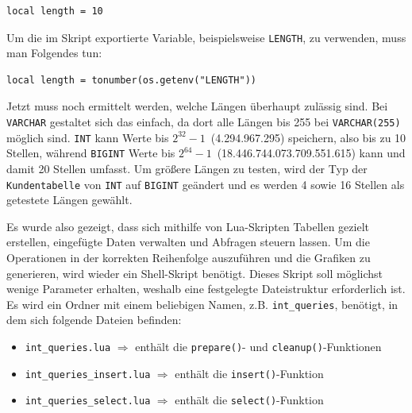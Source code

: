 \vspace{-5pt}
\begin{lstlisting}[language={[5.0]Lua},label={lst:tools-without-imported-length,style=custom_daniel}]
local length = 10
\end{lstlisting}
\vspace{-7pt}

Um die im Skript exportierte Variable, beispielsweise \texttt{LENGTH}, zu verwenden, muss man Folgendes tun:
\vspace{-5pt}
\begin{lstlisting}[language={[5.0]Lua},label={lst:tools-with-imported-length,style=custom_daniel}]
local length = tonumber(os.getenv("LENGTH"))
\end{lstlisting}
\vspace{-5pt}

Jetzt muss noch ermittelt werden, welche Längen überhaupt zulässig sind.
Bei \texttt{VARCHAR} gestaltet sich das einfach, da dort alle Längen bis 255 bei \texttt{VARCHAR(255)} möglich sind.
\texttt{INT} kann Werte bis \(2^{32} - 1\)~(4.294.967.295) speichern, also bis zu 10 Stellen, während \texttt{BIGINT} Werte bis \(2^{64} - 1\)~(18.446.744.073.709.551.615) kann und damit 20 Stellen umfasst.
Um größere Längen zu testen, wird der Typ der \texttt{Kundentabelle} von \texttt{INT} auf \texttt{BIGINT} geändert und es werden 4 sowie 16 Stellen als getestete Längen gewählt.

Es wurde also gezeigt, dass sich mithilfe von Lua-Skripten Tabellen gezielt erstellen, eingefügte Daten verwalten und Abfragen steuern lassen.
Um die Operationen in der korrekten Reihenfolge auszuführen und die Grafiken zu generieren, wird wieder ein Shell-Skript benötigt.
Dieses Skript soll möglichst wenige Parameter erhalten, weshalb eine festgelegte Dateistruktur erforderlich ist.
Es wird ein Ordner mit einem beliebigen Namen, z.B. \texttt{int\_queries}, benötigt, in dem sich folgende Dateien befinden:

\begin{itemize}\label{files_structure}
    \setlength{\itemsep}{-5pt}
    \item \texttt{int\_queries.lua} $\Rightarrow$ enthält die \texttt{prepare()}- und \texttt{cleanup()}-Funktionen
    \item \texttt{int\_queries\_insert.lua} $\Rightarrow$ enthält die \texttt{insert()}-Funktion
    \item \texttt{int\_queries\_select.lua} $\Rightarrow$ enthält die \texttt{select()}-Funktion
\end{itemize}

